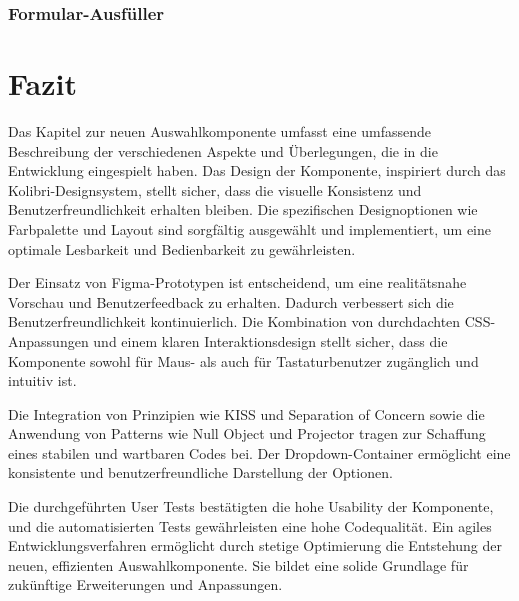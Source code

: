 

\subsubsection{Formular-Ausfüller}
\label{sec:userTestsEnduser}

% 


\section{Fazit}
\label{sec:summeryNew}
Das Kapitel zur neuen Auswahlkomponente umfasst eine umfassende Beschreibung der verschiedenen Aspekte und Überlegungen, die in die Entwicklung eingespielt haben. 
Das Design der Komponente, inspiriert durch das Kolibri-Designsystem, stellt sicher, dass die visuelle Konsistenz und Benutzerfreundlichkeit erhalten bleiben. 
Die spezifischen Designoptionen wie Farbpalette und Layout sind sorgfältig ausgewählt und implementiert, um eine optimale Lesbarkeit und Bedienbarkeit zu gewährleisten. 

Der Einsatz von Figma-Prototypen ist entscheidend, um eine realitätsnahe Vorschau und Benutzerfeedback zu erhalten. 
Dadurch verbessert sich die Benutzerfreundlichkeit kontinuierlich. 
Die Kombination von durchdachten CSS-Anpassungen und einem klaren Interaktionsdesign stellt sicher, dass die Komponente sowohl für Maus- als auch für Tastaturbenutzer zugänglich und intuitiv ist. 

Die Integration von Prinzipien wie KISS und Separation of Concern sowie die Anwendung von Patterns wie Null Object und Projector tragen zur Schaffung eines stabilen und wartbaren Codes bei. 
Der Dropdown-Container ermöglicht eine konsistente und benutzerfreundliche Darstellung der Optionen. 

Die durchgeführten User Tests bestätigten die hohe Usability der Komponente, und die automatisierten Tests gewährleisten eine hohe Codequalität. 
Ein agiles Entwicklungsverfahren ermöglicht durch stetige Optimierung die Entstehung der neuen, effizienten Auswahlkomponente. 
Sie bildet eine solide Grundlage für zukünftige Erweiterungen und Anpassungen. 
